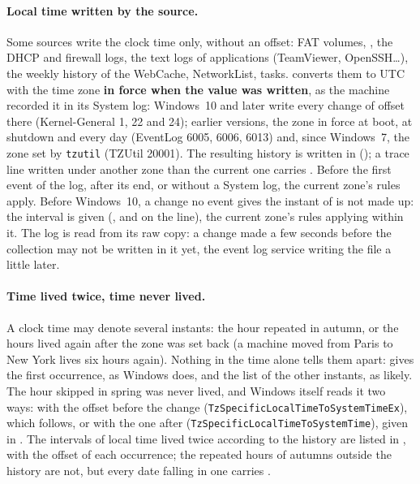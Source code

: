 \documentclass[11pt,a4paper,oneside]{report}
\begin{document}
\paragraph{Local time written by the source.}\label{sec:fuseaux} Some sources write the clock
time only, without an offset: FAT volumes, , the
DHCP and firewall logs, the text logs of applications (TeamViewer,
OpenSSH\ldots), the weekly history of the WebCache, NetworkList, 
tasks. \wac{} converts them to UTC with the time zone \textbf{in force when the
value was written}, as the machine recorded it in its System log: Windows~10
and later write every change of offset there (Kernel-General 1, 22 and 24);
earlier versions, the zone in force at boot, at shutdown and every day
(EventLog 6005, 6006, 6013) and, since Windows~7, the zone set by
\texttt{tzutil} (TZUtil 20001). The resulting history is written in
 (); a trace
line written under another zone than the current one carries
. Before the first event of the log, after its end, or
without a System log, the current zone's rules apply. Before Windows~10, a
change no event gives the instant of is not made up: the interval is given
(, and  on the
line), the current zone's rules applying within it. The log is read from its
raw copy: a change made a few seconds before the collection may not be
written in it yet, the event log service writing the file a little later.

\paragraph{Time lived twice, time never lived.} A clock time may denote
several instants: the hour repeated in autumn, or the hours lived again after
the zone was set back (a machine moved from Paris to New York lives six hours
again). Nothing in the time alone tells them apart:  gives the
first occurrence, as Windows does, and  the list of
the other instants, as likely. The hour skipped in spring was never lived, and
Windows itself reads it two ways: with the offset before the change
(\texttt{TzSpecificLocalTimeToSystemTimeEx}), which  follows, or
with the one after (\texttt{TzSpecificLocalTimeToSystemTime}), given in
. The intervals of local time lived twice according to
the history are listed in ,
with the offset of each occurrence; the repeated hours of autumns outside the
history are not, but every date falling in one carries
.
\end{document}
